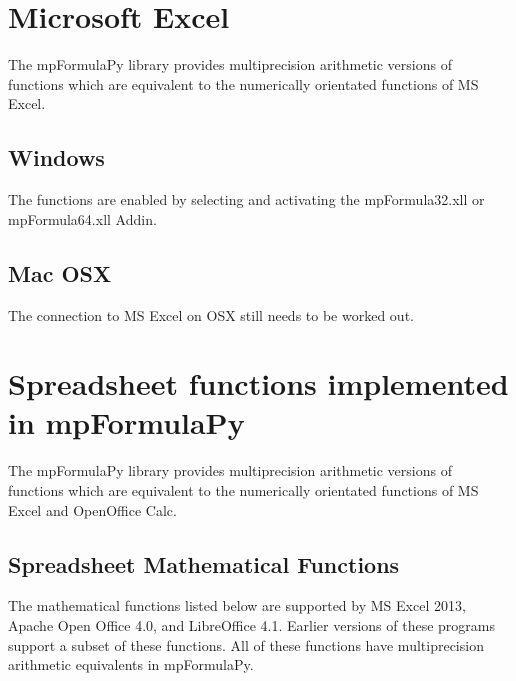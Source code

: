 \newpage
\section{Microsoft Excel}
The mpFormulaPy library provides multiprecision arithmetic versions of  functions which are equivalent to the numerically orientated functions of MS Excel.


\subsection{Windows}
The functions are enabled by selecting and activating the mpFormula32.xll or mpFormula64.xll Addin.


\subsection{Mac OSX}
The connection to MS Excel on OSX still needs to be worked out.




\newpage
\section{Spreadsheet functions implemented in mpFormulaPy}
\label{Using Spreadsheet functions}
The mpFormulaPy library provides multiprecision arithmetic versions of  functions which are equivalent to the numerically orientated functions of MS Excel and OpenOffice Calc.


\subsection{Spreadsheet Mathematical Functions}
The mathematical functions listed below are supported by MS Excel 2013, Apache Open Office 4.0, and LibreOffice 4.1. Earlier versions of these programs support a subset of these functions.
All of these functions have multiprecision arithmetic equivalents in mpFormulaPy.


